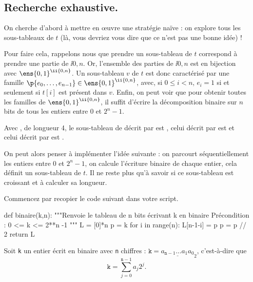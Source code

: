 \subsection{Recherche exhaustive.}

On cherche d'abord à mettre en {\oe}uvre une stratégie naïve : on explore tous les sous-tableaux de $t$ (là, vous devriez vous dire que ce n'est pas une bonne idée) ! 

Pour faire cela, rappelons nous que prendre un sous-tableau de $t$ correspond à prendre une partie de $\ii{0,n}$. Or, l'ensemble des parties de $\ii{0,n}$ est en bijection avec $\ens{0,1}^{\ii{0,n}}$.
Un sous-tableau $v$ de $t$ est donc caractérisé par une famille $\p{e_0,\dots,e_{n-1}} \in \ens{0,1}^{\ii{0,n}}$, avec, si $0\leq i < n$, $e_i = 1$ si et seulement si $t[i]$ est présent dans $v$.
Enfin, on peut voir que pour obtenir toutes les familles de $ \ens{0,1}^{\ii{0,n}}$, il suffit d'écrire la décomposition binaire sur $n$ bits de tous les entiers entre $0$ et $2^n-1$. 

\begin{exemple}
  Avec , de longueur 4, le sous-tableau de  décrit par \pyv{[0,0,0,0]} est \pyv{[]}, celui décrit par \pyv{[1,0,0,1]} est \pyv{[1,2]} et celui décrit par \pyv{[0,1,1,1]} est \pyv{[5,3,2]}.
\end{exemple}


On peut alors penser à implémenter l'idée suivante : on parcourt séquentiellement les entiers entre $0$ et $2^n-1$, on calcule l'écriture binaire de chaque entier, cela définit un sous-tableau de $t$.
Il ne reste plus qu'à savoir si ce sous-tableau est croissant et à calculer sa longueur. 

\medskip{}

Commencez par recopier le code suivant dans votre script. 

\begin{pyverbatim}
def binaire(k,n):
    """Renvoie le tableau de n bits écrivant k en binaire
    Précondition : 0 <= k <= 2**n -1 """
    L = [0]*n
    p = k
    for i in range(n):
        L[n-1-i] = p %
        p = p // 2
    return L
\end{pyverbatim}

\medskip{}

Soit \texttt{k} un entier écrit en binaire avec \texttt{n} chiffres : $\texttt{k} = \underline{a_{\texttt{n}-1}\ldots a_{1}a_{0}}_{2}$, c'est-à-dire que 
\begin{equation*}
  \texttt{k} = \sum_{j=0}^{\texttt{n}-1} a_j 2^j.
\end{equation*}

